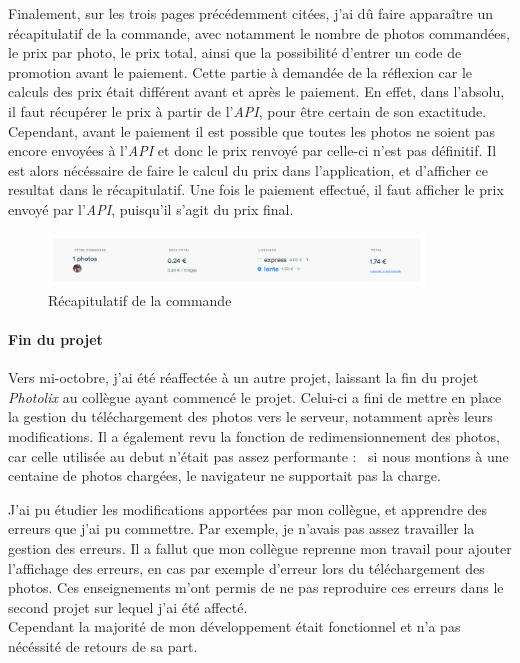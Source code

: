 \documentclass[12pt,a4paper]{article}
\begin{document}
  Finalement, sur les trois pages précédemment citées, j'ai dû faire
  apparaître un récapitulatif de la commande, avec notamment le nombre de
  photos commandées, le prix par photo, le prix total, ainsi que la
  possibilité d'entrer un code de promotion avant le paiement. Cette
  partie à demandée de la réflexion car le calculs des prix était
  différent avant et après le paiement. En effet, dans l'absolu, il faut
  récupérer le prix à partir de l'\emph{API}, pour être certain de son
  exactitude. Cependant, avant le paiement il est possible que toutes les
  photos ne soient pas encore envoyées à l'\emph{API} et donc le prix
  renvoyé par celle-ci n'est pas définitif. Il est alors nécéssaire de
  faire le calcul du prix dans l'application, et d'afficher ce resultat
  dans le récapitulatif. Une fois le paiement effectué, il faut afficher
  le prix envoyé par l'\emph{API}, puisqu'il s'agit du prix final.

  \begin{figure}[h]
    \centering
    \includegraphics[width=10cm]{figures/photolix-2.png}
    \caption{Récapitulatif de la commande}
  \end{figure}

  \bigskip

  \paragraph{Fin du projet}\label{fin-du-projet}

  \bigskip

  Vers mi-octobre, j'ai été réaffectée à un autre projet, laissant la fin
  du projet \emph{Photolix} au collègue ayant commencé le projet. Celui-ci
  a fini de mettre en place la gestion du téléchargement des photos vers
  le serveur, notamment après leurs modifications. Il a également revu la
  fonction de redimensionnement des photos, car celle utilisée au debut
  n'était pas assez performante : ~si nous montions à une centaine de
  photos chargées, le navigateur ne supportait pas la charge.

  \bigskip

  J'ai pu étudier les modifications apportées par mon collègue, et
  apprendre des erreurs que j'ai pu commettre. Par exemple, je n'avais pas
  assez travailler la gestion des erreurs. Il a fallut que mon collègue
  reprenne mon travail pour ajouter l'affichage des erreurs, en cas par
  exemple d'erreur lors du téléchargement des photos. Ces enseignements
  m'ont permis de ne pas reproduire ces erreurs dans le second projet sur
  lequel j'ai été affecté.\\
  Cependant la majorité de mon développement était fonctionnel et n'a pas
  nécéssité de retours de sa part.
\end{document}

